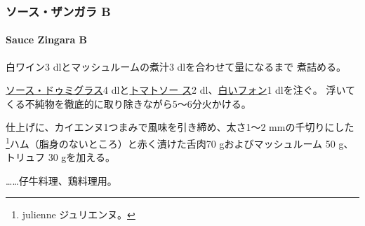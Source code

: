 \begin{recette}
\maeaki

\hypertarget{ux30bdux30fcux30b9ux30b6ux30f3ux30acux30e9-b}{%
\subsubsection{ソース・ザンガラ
B}\label{ux30bdux30fcux30b9ux30b6ux30f3ux30acux30e9-b}}

\hypertarget{sauce-zingara-b}{%
\paragraph{Sauce Zingara B}\label{sauce-zingara-b}}

白ワイン3 dlとマッシュルームの煮汁3 dlを合わせて\untiers{}量になるまで
煮詰める。

\protect\hyperlink{sauce-demi-glace}{ソース・ドゥミグラス}4
dlと\protect\hyperlink{sauce-tomate}{トマトソー ス}2\undemi{}
dl、\protect\hyperlink{fonds-blanc}{白いフォン}1 dlを注ぐ。
浮いてくる不純物を徹底的に取り除きながら5〜6分火かける。

仕上げに、カイエンヌ1つまみで風味を引き締め、太さ1〜2 mmの千切りにした
\footnote{julienne ジュリエンヌ。}ハム（脂身のないところ）と赤く漬けた舌肉70
gおよびマッシュルーム 50 g、トリュフ 30 gを加える。

\ldots{}\ldots{}仔牛料理、鶏料理用。
\end{recette}